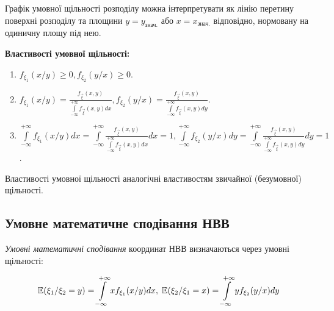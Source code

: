 \begin{remark}
    Графік умовної щільності розподілу можна інтерпретувати як лінію перетину 
    поверхні розподілу та площини $y = y_{\text{знач.}}$ або
    $x = x_{\text{знач.}}$ відповідно, нормовану на одиничну площу під нею.
\end{remark}

\noindent \textbf{Властивості умовної щільності:}
\begin{enumerate}
    \item $f_{\xi_1}(x / y) \geq 0, f_{\xi_2}(y / x) \geq 0$.
    \item $f_{\xi_1}(x/y) = \frac{f_{\vec{\xi}}(x,y)}
    {\int\limits_{-\infty}^{+\infty}f_{\vec{\xi}}(x,y)dx},
    f_{\xi_2}(y/x) = \frac{f_{\vec{\xi}}(x,y)}
    {\int\limits_{-\infty}^{+\infty}f_{\vec{\xi}}(x,y)dy}$.
    \item $\int\limits_{-\infty}^{+\infty} f_{\xi_1}(x / y) dx = 
    \int\limits_{-\infty}^{+\infty}\frac{f_{\vec{\xi}}(x,y)}
    {\int\limits_{-\infty}^{+\infty}f_{\vec{\xi}}(x,y)dx}dx = 1,
    \int\limits_{-\infty}^{+\infty} f_{\xi_2}(y / x) dy = 
    \int\limits_{-\infty}^{+\infty}\frac{f_{\vec{\xi}}(x,y)}
    {\int\limits_{-\infty}^{+\infty}f_{\vec{\xi}}(x,y)dy}dy = 1$.
\end{enumerate}
Властивості умовної щільності аналогічні властивостям звичайної (безумовної) щільності.

\subsection{Умовне математичне сподівання НВВ}
\emph{Умовні математичні сподівання} координат НВВ визначаються через умовні щільності:

\begin{equation}\label{eq:cond_dens}
    \mathbb{E}(\xi_1 / \xi_2 = y) = \int\limits_{-\infty}^{+\infty} xf_{\xi_1}(x/y)dx, \;
    \mathbb{E}(\xi_2 / \xi_1 = x) = \int\limits_{-\infty}^{+\infty} yf_{\xi_2}(y/x)dy
\end{equation}

